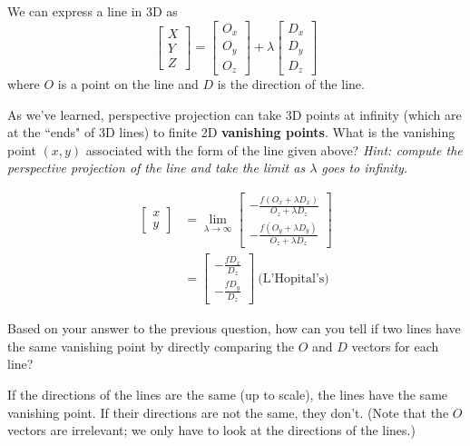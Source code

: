 \begin{blocksection}
\question We can express a line in 3D as
$$
\begin{bmatrix}X \\ Y \\ Z\end{bmatrix} =
\begin{bmatrix}O_x \\ O_y \\ O_z\end{bmatrix} +
\lambda \begin{bmatrix}D_x \\ D_y \\ D_z\end{bmatrix}$$
where $O$ is a point on the line and $D$ is the direction of the line.

As we've learned, perspective projection can take 3D points at infinity (which are at the ``ends" of 3D lines) to finite 2D {\bf vanishing points}. What is the vanishing point $(x, y)$ associated with the form of the line given above? {\it Hint: compute the perspective projection of the line and take the limit as $\lambda$ goes to infinity.}

\begin{solution}[0.75in]
\begin{align*}
\begin{bmatrix}x \\ y\end{bmatrix} &=
\lim_{\lambda \rightarrow \infty}
\begin{bmatrix}-\frac{f(O_x + \lambda D_x)}{O_z + \lambda D_z} \\[6pt] -\frac{f(O_y + \lambda D_y)}{O_z + \lambda D_z}\end{bmatrix} \\
&= \begin{bmatrix}-\frac{fD_x}{D_z} \\[6pt] -\frac{fD_y}{D_z}\end{bmatrix}~\text{(L'Hopital's)}
\end{align*}
\end{solution}
\end{blocksection}


\begin{blocksection}
\question Based on your answer to the previous question, how can you tell if two lines have the same vanishing point by directly comparing the $O$ and $D$ vectors for each line?

\begin{solution}[0.75in]
If the directions of the lines are the same (up to scale), the lines have the same vanishing point. If their directions are not the same, they don't. (Note that the $O$ vectors are irrelevant; we only have to look at the directions of the lines.)
\end{solution}
\end{blocksection}
